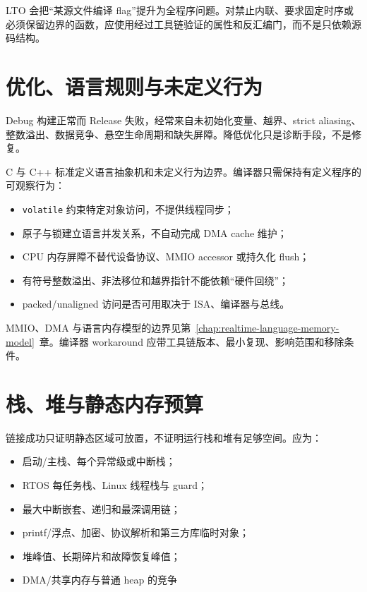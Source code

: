 LTO 会把“某源文件编译 flag”提升为全程序问题。对禁止内联、要求固定时序或必须保留边界的函数，应使用经过工具链验证的属性和反汇编门，而不是只依赖源码结构。

\section{优化、语言规则与未定义行为}

Debug 构建正常而 Release 失败，经常来自未初始化变量、越界、strict aliasing、整数溢出、数据竞争、悬空生命周期和缺失屏障。降低优化只是诊断手段，不是修复。

C 与 C++ 标准定义语言抽象机和未定义行为边界\cite{iso-c-2024,iso-cpp-2024}。编译器只需保持有定义程序的可观察行为：

\begin{itemize}
  \item \texttt{volatile} 约束特定对象访问，不提供线程同步；
  \item 原子与锁建立语言并发关系，不自动完成 DMA cache 维护；
  \item CPU 内存屏障不替代设备协议、MMIO accessor 或持久化 flush；
  \item 有符号整数溢出、非法移位和越界指针不能依赖“硬件回绕”；
  \item packed/unaligned 访问是否可用取决于 ISA、编译器与总线。
\end{itemize}

MMIO、DMA 与语言内存模型的边界见第~\ref{chap:realtime-language-memory-model}~章。编译器 workaround 应带工具链版本、最小复现、影响范围和移除条件。

\section{栈、堆与静态内存预算}

链接成功只证明静态区域可放置，不证明运行栈和堆有足够空间。应为：

\begin{itemize}
  \item 启动/主栈、每个异常级或中断栈；
  \item RTOS 每任务栈、Linux 线程栈与 guard；
  \item 最大中断嵌套、递归和最深调用链；
  \item printf/浮点、加密、协议解析和第三方库临时对象；
  \item 堆峰值、长期碎片和故障恢复峰值；
  \item DMA/共享内存与普通 heap 的竞争
\end{itemize}

